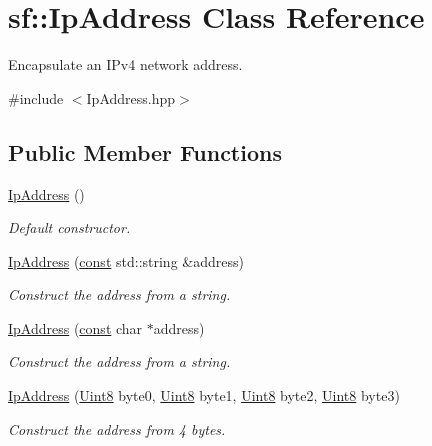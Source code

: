 \hypertarget{classsf_1_1_ip_address}{\section{sf\-:\-:Ip\-Address Class Reference}
\label{classsf_1_1_ip_address}
}


Encapsulate an I\-Pv4 network address.  




{\ttfamily \#include $<$Ip\-Address.\-hpp$>$}

\subsection*{Public Member Functions}
\begin{DoxyCompactItemize}
\item 
\hyperlink{classsf_1_1_ip_address_af32a0574baa0f46e48deb2d83ca7658b}{Ip\-Address} ()
\begin{DoxyCompactList}\small\item\em Default constructor. \end{DoxyCompactList}\item 
\hyperlink{classsf_1_1_ip_address_a656b7445ab04cabaa7398685bc09c3f7}{Ip\-Address} (\hyperlink{term__entry_8h_a57bd63ce7f9a353488880e3de6692d5a}{const} std\-::string \&address)
\begin{DoxyCompactList}\small\item\em Construct the address from a string. \end{DoxyCompactList}\item 
\hyperlink{classsf_1_1_ip_address_a92f2a9be74334a61b96c2fc79fe6eb78}{Ip\-Address} (\hyperlink{term__entry_8h_a57bd63ce7f9a353488880e3de6692d5a}{const} char $\ast$address)
\begin{DoxyCompactList}\small\item\em Construct the address from a string. \end{DoxyCompactList}\item 
\hyperlink{classsf_1_1_ip_address_a1d289dcb9ce7a64c600c6f84cba88cc6}{Ip\-Address} (\hyperlink{namespacesf_a4ef3d630785c4f296f9b4f274c33d78e}{Uint8} byte0, \hyperlink{namespacesf_a4ef3d630785c4f296f9b4f274c33d78e}{Uint8} byte1, \hyperlink{namespacesf_a4ef3d630785c4f296f9b4f274c33d78e}{Uint8} byte2, \hyperlink{namespacesf_a4ef3d630785c4f296f9b4f274c33d78e}{Uint8} byte3)
\begin{DoxyCompactList}\small\item\em Construct the address from 4 bytes. \end{DoxyCompactList}\item 

\end{DoxyCompactItemize}
